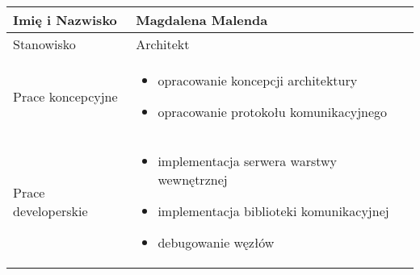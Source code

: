 \begin{longtable}{| p{} | p{} |}
\hline
Imię i Nazwisko & Magdalena Malenda \\ \hline
Stanowisko & Architekt \\ \hline
Prace koncepcyjne & \begin{itemize} 
\item opracowanie koncepcji architektury
\item opracowanie protokołu komunikacyjnego \end{itemize} \\ \hline
Prace developerskie & \begin{itemize}
\item implementacja serwera warstwy wewnętrznej
\item implementacja biblioteki komunikacyjnej
\item debugowanie węzłów
\end{itemize} \\ \hline
\end{longtable}

